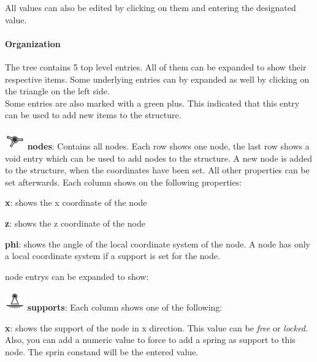 \documentclass[a4paper,11pt]{report}
\begin{document}
All values can also be edited by clicking on them and entering the designated value.\\

\paragraph{Organization}

The tree contains 5 top level entries. All of them can be expanded to show their respective items. Some underlying entries can by expanded as well by clicking on the triangle on the left side.\\

Some entries are also marked with a green plus. This indicated that this entry can be used to add new items to the structure.


\begin{trivlist}
	\item[] \includegraphics[scale = 0.5]{../../icons/node.png} \textbf{nodes}: Contains all nodes. Each row shows one node, the last row shows a void entry which can be used to add nodes to the structure. A new node is added to the structure, when the coordinates have been set. All other properties can be set afterwards. Each column shows on the following properties:
	\begin{trivlist}
		\leftskip=1cm
		\item[]\textbf{x}: shows the x coordinate of the node
		\item[]\textbf{z}: shows the z coordinate of the node
		\item[]\textbf{phi}: shows the angle of the local coordinate system of the node. A node has only a local coordinate system if a support is set for the node.
	\end{trivlist}
	node entrys can be expanded to show: 
	\begin{trivlist}
		\leftskip=1cm
		\item[] \includegraphics[scale = 0.5]{../../icons/bearing.png} \textbf{supports}: Each column shows one of the following:
		\begin{trivlist}
		\leftskip=2cm
		\item[]\textbf{x}: shows the support of the node in x direction. This value can be \textit{free} or \textit{locked}. Also, you can add a numeric value to force \colin to add a spring as support to this node. The sprin constand will be the entered value.

\end{trivlist}
\end{trivlist}
\end{trivlist}
\end{document}
